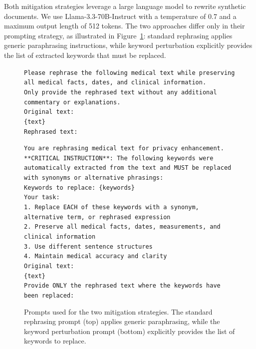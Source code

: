 Both mitigation strategies leverage a large language model to rewrite synthetic documents. We use Llama-3.3-70B-Instruct with a temperature of 0.7 and a maximum output length of 512 tokens. The two approaches differ only in their prompting strategy, as illustrated in Figure~\ref{fig:mitigation_prompts}: standard rephrasing applies generic paraphrasing instructions, while keyword perturbation explicitly provides the list of extracted keywords that must be replaced.

\begin{figure}[h]
\centering
\begin{tcolorbox}[colback=blue!5!white, colframe=blue!50!black, title=Standard Rephrasing Prompt]
\small
\texttt{Please rephrase the following medical text while preserving all medical facts, dates, and clinical information.}\\
\texttt{Only provide the rephrased text without any additional commentary or explanations.}\\[0.5em]
\texttt{Original text:}\\
\texttt{\{text\}}\\[0.5em]
\texttt{Rephrased text:}
\end{tcolorbox}

\vspace{0.5em}

\begin{tcolorbox}[colback=green!5!white, colframe=green!50!black, title=Keyword Perturbation Prompt]
\small
\texttt{You are rephrasing medical text for privacy enhancement.}\\[0.5em]
\texttt{**CRITICAL INSTRUCTION**: The following keywords were automatically extracted from the text and MUST be replaced with synonyms or alternative phrasings:}\\[0.5em]
\texttt{Keywords to replace: \{keywords\}}\\[0.5em]
\texttt{Your task:}\\
\texttt{1. Replace EACH of these keywords with a synonym, alternative term, or rephrased expression}\\
\texttt{2. Preserve all medical facts, dates, measurements, and clinical information}\\
\texttt{3. Use different sentence structures}\\
\texttt{4. Maintain medical accuracy and clarity}\\[0.5em]
\texttt{Original text:}\\
\texttt{\{text\}}\\[0.5em]
\texttt{Provide ONLY the rephrased text where the keywords have been replaced:}
\end{tcolorbox}
\caption{Prompts used for the two mitigation strategies. The standard rephrasing prompt (top) applies generic paraphrasing, while the keyword perturbation prompt (bottom) explicitly provides the list of keywords to replace.}
\label{fig:mitigation_prompts}
\end{figure}

